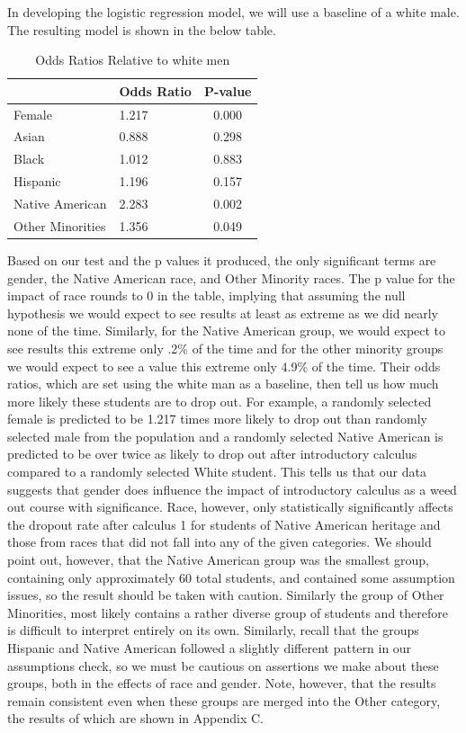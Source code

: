 \documentclass[]{article}
\begin{document}
In developing the logistic regression model, we will use a baseline of a
white male. The resulting model is shown in the below table.

\begin{table}[H]

\caption{\label{tab:odds_ratios}Odds Ratios Relative to white men}
\centering
\fontsize{12}{14}\selectfont
\begin{tabular}[t]{l|l|c}
\hline
  & Odds Ratio & P-value\\
\hline
Female & 1.217 & 0.000\\
\hline
Asian & 0.888 & 0.298\\
\hline
Black & 1.012 & 0.883\\
\hline
Hispanic & 1.196 & 0.157\\
\hline
Native American & 2.283 & 0.002\\
\hline
Other Minorities & 1.356 & 0.049\\
\hline
\end{tabular}
\end{table}

Based on our test and the p values it produced, the only significant
terms are gender, the Native American race, and Other Minority races.
The p value for the impact of race rounds to 0 in the table, implying
that assuming the null hypothesis we would expect to see results at
least as extreme as we did nearly none of the time. Similarly, for the
Native American group, we would expect to see results this extreme only
.2\% of the time and for the other minority groups we would expect to
see a value this extreme only 4.9\% of the time. Their odds ratios,
which are set using the white man as a baseline, then tell us how much
more likely these students are to drop out. For example, a randomly
selected female is predicted to be 1.217 times more likely to drop out
than randomly selected male from the population and a randomly selected
Native American is predicted to be over twice as likely to drop out
after introductory calculus compared to a randomly selected White
student. This tells us that our data suggests that gender does influence
the impact of introductory calculus as a weed out course with
significance. Race, however, only statistically significantly affects
the dropout rate after calculus 1 for students of Native American
heritage and those from races that did not fall into any of the given
categories. We should point out, however, that the Native American group
was the smallest group, containing only approximately 60 total students,
and contained some assumption issues, so the result should be taken with
caution. Similarly the group of Other Minorities, most likely contains a
rather diverse group of students and therefore is difficult to interpret
entirely on its own. Similarly, recall that the groups Hispanic and
Native American followed a slightly different pattern in our assumptions
check, so we must be cautious on assertions we make about these groups,
both in the effects of race and gender. Note, however, that the results
remain consistent even when these groups are merged into the Other
category, the results of which are shown in Appendix C.
\end{document}

